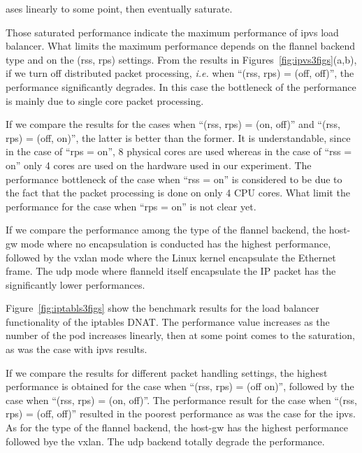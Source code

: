 ases linearly to some point, 
then eventually saturate.

Those saturated performance indicate the maximum performance of ipvs load balancer.
What limits the maximum performance depends on the flannel backend type and on the (rss, rps) settings.
From the results in Figures~\ref{fig:ipvs3figs}(a,b), if we turn off distributed packet processing,
{\it i.e.} when \enquote{(rss, rps) = (off, off)}, the performance significantly degrades. 
In this case the bottleneck of the performance is mainly due to single core packet processing.

If we compare the results for the cases when \enquote{(rss, rps) = (on, off)} and \enquote{(rss, rps) = (off, on)},
the latter is better than the former.
It is understandable, since in the case of \enquote{rps = on}, 8 physical cores are used whereas 
in the case of \enquote{rss = on} only 4 cores are used on the hardware used in our experiment.
The performance bottleneck of the case when \enquote{rss = on} is considered 
to be due to the fact that the packet processing is done on only 4 CPU cores.
What limit the performance for the case when \enquote{rps = on} is not clear yet.

If we compare the performance among the type of the flannel backend, 
the host-gw mode where no encapsulation is conducted has the highest performance,
followed by the vxlan mode where the Linux kernel encapsulate the Ethernet frame.
The udp mode where flanneld itself encapsulate the IP packet has the significantly lower performances.

Figure~\ref{fig:iptabls3figs} show the benchmark results for the load balancer 
functionality of the iptables DNAT. 
The performance value increases as the number of the pod increases linearly, 
then at some point comes to the saturation, as was the case with ipvs results.

If we compare the results for different packet handling settings, the highest performance is 
obtained for the case when \enquote{(rss, rps) = (off on)}, followed by the case when \enquote{(rss, rps) = (on, off)}. 
The performance result for the case when \enquote{(rss, rps) = (off, off)} resulted in the 
poorest performance as was the case for the ipvs.
As for the type of the flannel backend, the host-gw has the highest performance followed 
bye the vxlan. The udp backend totally degrade the performance.

